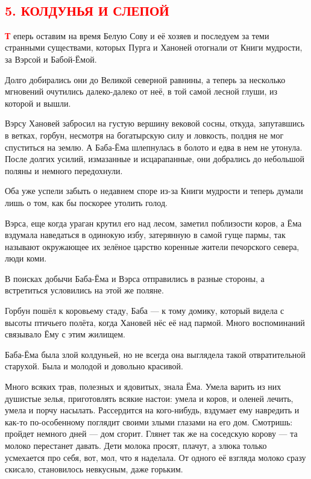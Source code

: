 \documentclass[oneside,final,14pt]{extreport}
\begin{document}
	\
	{%
		\centering
		\subsection*{\textcolor{red}{5. КОЛДУНЬЯ И СЛЕПОЙ}}
	}
	
	\lettrine[findent=0pt]{\textbf{\textcolor{red}{Т}}}{}  еперь оставим на время Белую Сову и её хозяев и последуем за теми странными существами, которых Пурга и Ханоней отогнали от Книги мудрости, за Вэрсой и Бабой-Ёмой.
	
	Долго добирались они до Великой северной равнины, а теперь за несколько мгновений очутились далеко-далеко от неё, в той самой лесной глуши, из которой и вышли.
	
	Вэрсу Хановей забросил на густую вершину вековой сосны, откуда, запутавшись в ветках, горбун, несмотря на богатырскую силу и ловкость, полдня не мог спуститься на землю. А Баба-Ёма шлепнулась в болото и едва в нем не утонула. После долгих усилий, измазанные и исцарапанные, они добрались до небольшой поляны и немного передохнули.
	
	Оба уже успели забыть о недавнем споре из-за Книги мудрости и теперь думали лишь о том, как бы поскорее утолить голод.
	
	Вэрса, еще когда ураган крутил его над лесом, заметил поблизости коров, а Ёма вздумала наведаться в одинокую избу, затерянную в самой гуще пармы, так называют окружающее их зелёное царство коренные жители печорского севера, люди коми.
	
	В поисках добычи Баба-Ёма и Вэрса отправились в разные стороны, а встретиться условились на этой же поляне.
	
	Горбун пошёл к коровьему стаду, Баба — к тому домику, который видела с высоты птичьего полёта, когда Хановей нёс её над пармой. Много воспоминаний связывало Ёму с этим жилищем.
	
	Баба-Ёма была злой колдуньей, но не всегда она выглядела такой отвратительной старухой. Была и молодой и довольно красивой.
	
	Много всяких трав, полезных и ядовитых, знала Ёма. Умела варить из них душистые зелья, приготовлять всякие настои: умела и коров, и оленей лечить, умела и порчу насылать. Рассердится на кого-нибудь, вздумает ему навредить и как-то по-особенному поглядит своими злыми глазами на его дом. Смотришь: пройдет немного дней — дом сгорит. Глянет так же на соседскую корову — та молоко перестанет давать. Дети молока просят, плачут, а злюка только усмехается про себя, вот, мол, что я наделала. От одного её взгляда молоко сразу скисало, становилось невкусным, даже горьким.
	
\end{document}
